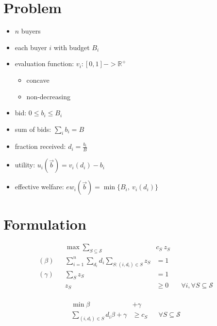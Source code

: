 \documentclass[11pt,a4paper]{article}
\begin{document}
\section{Problem}

\begin{itemize}
    \item $n$ buyers
    \item each buyer $i$ with budget $B_i$
    \item evaluation function: $v_i : [0,1] -> \mathbb{R}^+$
    \begin{itemize}
        \item concave
        \item non-decreasing
    \end{itemize}
    \item bid: $0 \le b_i \le B_i$
    \item sum of bids: $\sum_i b_i = B$
    \item fraction received: $d_i = \frac{b_i}{B}$
    \item utility: $u_i(\vec{b}) = v_i(d_i) - b_i$
    \item effective welfare: $ew_i(\vec{b}) = \min\{B_i,\ v_i(d_i)\}$
\end{itemize}


\section{Formulation}

\begin{minipage}[t]{0.59\textwidth}
	\begin{align*}
		&& \max  \sum_{S \subseteq \mathcal{S}} &c_{S}\ z_{S} \\
		(\beta) && \sum_{i=1}^{n} \sum_{d_{i}} d_{i} \sum_{S: (i,d_{i}) \in S } z_{S} &= 1 & & \\
		(\gamma) && \sum_{S} z_{S}  &= 1	& & \\
		&& z_{S} &\geq 0 & & \forall i, \forall S \subseteq \mathcal{S}\\
	\end{align*}
\end{minipage}
\begin{minipage}[t]{0.3\textwidth}
	\begin{align*}
		\min \beta &+ \gamma \\
		\sum_{(i,d_{i}) \in S} d_{i} \beta + \gamma &\geq c_{S}  & & \forall S \subseteq \mathcal{S}\\
\end{align*}
\end{minipage}
\end{document}
